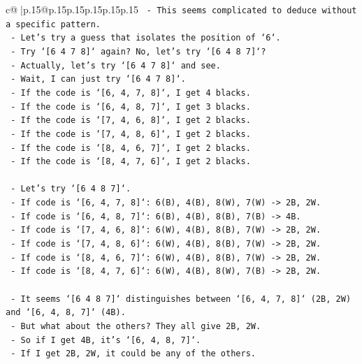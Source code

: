 \documentclass{article}
\begin{document}
{\begin{supertabular}{c@{$\;$}|p{.15\linewidth}@{}p{.15\linewidth}p{.15\linewidth}p{.15\linewidth}p{.15\linewidth}p{.15\linewidth}}
{{{\texttt{    {-} This seems complicated to deduce without a specific pattern.} \\
\texttt{    {-} Let's try a guess that isolates the position of `6`.} \\
\texttt{    {-} Try `{[}6 4 7 8{]}` again? No, let's try `{[}6 4 8 7{]}`?} \\
\texttt{    {-} Actually, let's try `{[}6 4 7 8{]}` and see.} \\
\texttt{    {-} Wait, I can just try `{[}6 4 7 8{]}`.} \\
\texttt{    {-} If the code is `{[}6, 4, 7, 8{]}`, I get 4 blacks.} \\
\texttt{    {-} If the code is `{[}6, 4, 8, 7{]}`, I get 3 blacks.} \\
\texttt{    {-} If the code is `{[}7, 4, 6, 8{]}`, I get 2 blacks.} \\
\texttt{    {-} If the code is `{[}7, 4, 8, 6{]}`, I get 2 blacks.} \\
\texttt{    {-} If the code is `{[}8, 4, 6, 7{]}`, I get 2 blacks.} \\
\texttt{    {-} If the code is `{[}8, 4, 7, 6{]}`, I get 2 blacks.} \\
\\ 
\texttt{    {-} Let's try `{[}6 4 8 7{]}`.} \\
\texttt{        {-} If code is `{[}6, 4, 7, 8{]}`: 6(B), 4(B), 8(W), 7(W) {-}> 2B, 2W.} \\
\texttt{        {-} If code is `{[}6, 4, 8, 7{]}`: 6(B), 4(B), 8(B), 7(B) {-}> 4B.} \\
\texttt{        {-} If code is `{[}7, 4, 6, 8{]}`: 6(W), 4(B), 8(B), 7(W) {-}> 2B, 2W.} \\
\texttt{        {-} If code is `{[}7, 4, 8, 6{]}`: 6(W), 4(B), 8(B), 7(W) {-}> 2B, 2W.} \\
\texttt{        {-} If code is `{[}8, 4, 6, 7{]}`: 6(W), 4(B), 8(B), 7(W) {-}> 2B, 2W.} \\
\texttt{        {-} If code is `{[}8, 4, 7, 6{]}`: 6(W), 4(B), 8(W), 7(B) {-}> 2B, 2W.} \\
\\ 
\texttt{    {-} It seems `{[}6 4 8 7{]}` distinguishes between `{[}6, 4, 7, 8{]}` (2B, 2W) and `{[}6, 4, 8, 7{]}` (4B).} \\
\texttt{    {-} But what about the others? They all give 2B, 2W.} \\
\texttt{    {-} So if I get 4B, it's `{[}6, 4, 8, 7{]}`.} \\
\texttt{    {-} If I get 2B, 2W, it could be any of the others.} \\
}}}
\end{supertabular}}
\end{document}
